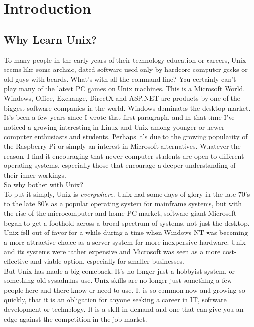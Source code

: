 \chapter{Introduction}

\section{Why Learn Unix?}

To many people in the early years of their technology education or careers, Unix seems like some archaic, dated software used only by hardcore computer geeks or old guys with beards.  What's with all the command line?  You certainly can't play many of the latest PC games on Unix machines.  This is a Microsoft World.  Windows, Office, Exchange, DirectX and ASP.NET are products by one of the biggest software companies in the world.  Windows dominates the desktop market.\\

It's been a few years since I wrote that first paragraph, and in that time I've noticed a growing interesting in Linux and Unix among younger or newer computer enthusiasts and students.  Perhaps it's due to the growing popularity of the Raspberry Pi or simply an interest in Microsoft alternatives.  Whatever the reason, I find it encouraging that newer computer students are open to different operating systems, especially those that encourage a deeper understanding of their inner workings.\\

So why bother with Unix?\\

To put it simply, Unix is \textit{everywhere}.  Unix had some days of glory in the late 70's to the late 80's as a popular operating system for mainframe systems, but with the rise of the microcomputer and home PC market, software giant Microsoft began to get a foothold across a broad spectrum of systems, not just the desktop.  Unix fell out of favor for a while during a time when Windows NT was becoming a more attractive choice as a server system for more inexpensive hardware.  Unix and its systems were rather expensive and Microsoft was seen as a more cost-effective and viable option, especially for smaller businesses.\\

But Unix has made a big comeback.  It's no longer just a hobbyist system, or something old sysadmins use.  Unix skills are no longer just something a few people here and there know or need to use.  It is so common now and growing so quickly, that it is an obligation for anyone seeking a career in IT, software development or technology.  It is a skill in demand and one that can give you an edge against the competition in the job market.\\

